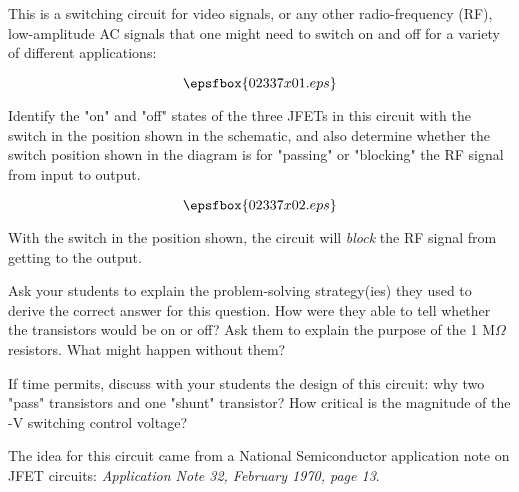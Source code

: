 

This is a switching circuit for video signals, or any other radio-frequency (RF), low-amplitude AC signals that one might need to switch on and off for a variety of different applications:

$$\epsfbox{02337x01.eps}$$

Identify the "on" and "off" states of the three JFETs in this circuit with the switch in the position shown in the schematic, and also determine whether the switch position shown in the diagram is for "passing" or "blocking" the RF signal from input to output.







$$\epsfbox{02337x02.eps}$$

With the switch in the position shown, the circuit will {\it block} the RF signal from getting to the output.







Ask your students to explain the problem-solving strategy(ies) they used to derive the correct answer for this question.  How were they able to tell whether the transistors would be on or off?  Ask them to explain the purpose of the 1 M$\Omega$ resistors.  What might happen without them?

If time permits, discuss with your students the design of this circuit: why two "pass" transistors and one "shunt" transistor?  How critical is the magnitude of the -V switching control voltage?

The idea for this circuit came from a National Semiconductor application note on JFET circuits: {\it Application Note 32, February 1970, page 13}.




